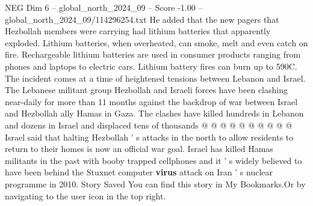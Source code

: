 \begin{textsample}{NEG Dim 6 – global\_north\_2024\_09 – Score -1.00 – global\_north\_2024\_09/114296254.txt}
He added that the new pagers that Hezbollah members were carrying had lithium batteries that apparently exploded.
Lithium batteries, when overheated, can smoke, melt and even catch on fire.
Rechargeable lithium batteries are used in consumer products ranging from phones and laptops to electric cars.
Lithium battery fires can burn up to 590C.
The incident comes at a time of heightened tensions between Lebanon and Israel.
The Lebanese militant group Hezbollah and Israeli forces have been clashing near-daily for more than 11 months against the backdrop of war between Israel and Hezbollah ally Hamas in Gaza.
The clashes have killed hundreds in Lebanon and dozens in Israel and displaced tens of thousands @ @ @ @ @ @ @ @ @ @ Israel said that halting Hezbollah ' s attacks in the north to allow residents to return to their homes is now an official war goal.
Israel has killed Hamas militants in the past with booby trapped cellphones and it ' s widely believed to have been behind the Stuxnet computer \textbf{virus} attack on Iran ' s nuclear programme in 2010.
Story Saved You can find this story in My Bookmarks.Or by navigating to the user icon in the top right.

\end{textsample}
